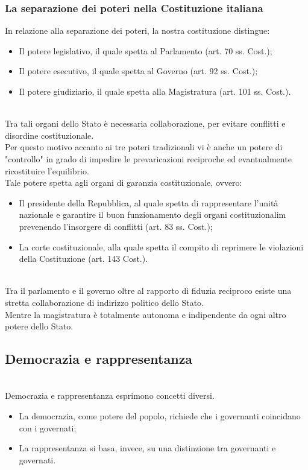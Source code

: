 \documentclass{report}
\begin{document}
\subsubsection{La separazione dei poteri nella Costituzione italiana}
In relazione alla separazione dei poteri, la nostra costituzione distingue:
\begin{itemize}
  \item Il potere legislativo, il quale spetta al Parlamento (art. 70 ss. Cost.);
  \item Il potere esecutivo, il quale spetta al Governo (art. 92 ss. Cost.);
  \item Il potere giudiziario, il quale spetta alla Magistratura (art. 101 ss. Cost.).
\end{itemize}
\\
Tra tali organi dello Stato è necessaria collaborazione, per evitare conflitti e disordine costituzionale.
\\
Per questo motivo accanto ai tre poteri tradizionali vi è anche un potere di "controllo" in grado di impedire le prevaricazioni reciproche ed evantualmente ricostituire l'equilibrio. 
\\
Tale potere spetta agli organi di garanzia costituzionale, ovvero:
\\
\begin{itemize}
  \item Il presidente della Repubblica, al quale spetta di rappresentare l'unità nazionale e garantire il buon funzionamento degli organi costituzionalim prevenendo l'insorgere di conflitti (art. 83 ss. Cost.);
  \item La corte costituzionale, alla quale spetta il compito di reprimere le violazioni della Costituzione (art. 143 Cost.).
\end{itemize}
\\
Tra il parlamento e il governo oltre al rapporto di fiduzia reciproco esiste una stretta collaborazione di indirizzo politico dello Stato.
\\
Mentre la magistratura è totalmente autonoma e indipendente da ogni altro potere dello Stato.
\\
\subsection{Democrazia e rappresentanza}
\\
Democrazia e rappresentanza esprimono concetti diversi.
\\
\begin{itemize}
  \item La democrazia, come potere del popolo, richiede che i governanti coincidano con i governati;
  \item La rappresentanza si basa, invece, su una distinzione tra governanti e governati.
\end{itemize}
\\
\end{document}
